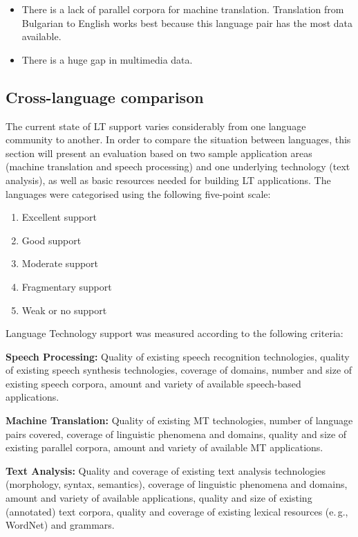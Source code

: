 \documentclass[]{../../metanetpaper}
\begin{document}
\begin{multicols}{2}
\begin{itemize}
\item There is a lack of parallel corpora for machine translation. Translation from Bulgarian to English works best because this language pair has the most data available. 

\item There is a huge gap in multimedia data.
\end{itemize}

\subsection{Cross-language comparison}

The current state of LT support varies considerably from one language community to another. In order to compare the situation between languages, this section will present an evaluation based on two sample application areas (machine translation and speech processing) and one underlying technology (text analysis), as well as basic resources needed for building LT applications. The languages were categorised using the following five-point scale: 

\begin{enumerate}
\item Excellent support
\item Good support
\item Moderate support
\item Fragmentary support
\item Weak or no support
\end{enumerate}

Language Technology support was measured according to the following criteria:

\textbf{Speech Processing:} Quality of existing speech recognition technologies, quality of existing speech synthesis technologies, coverage of domains, number and size of existing speech corpora, amount and variety of available speech-based applications.

\textbf{Machine Translation:} Quality of existing MT technologies, number of language pairs covered, coverage of linguistic phenomena and domains, quality and size of existing parallel corpora, amount and variety of available MT applications.

\textbf{Text Analysis:} Quality and coverage of existing text analysis technologies (morphology, syntax, semantics), coverage of linguistic phenomena and domains, amount and variety of available applications, quality and size of existing (annotated) text corpora, quality and coverage of existing lexical resources (e.\,g., WordNet) and grammars.


\end{multicols}
\end{document}
